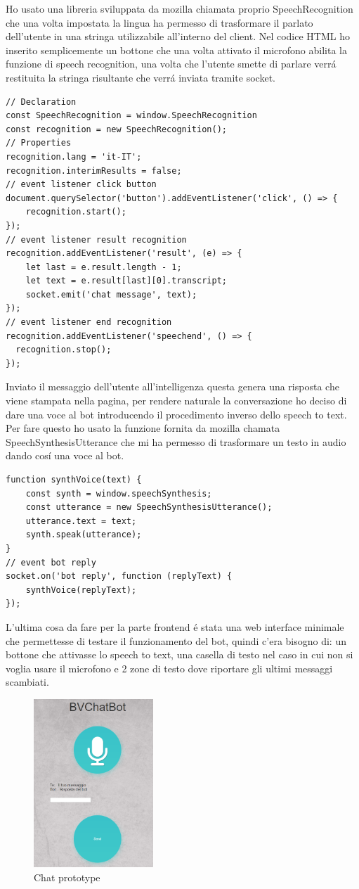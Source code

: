 Ho usato una libreria sviluppata da mozilla chiamata proprio SpeechRecognition che una volta impostata la lingua ha permesso di trasformare il parlato dell'utente in una stringa utilizzabile all'interno del client.
Nel codice HTML ho inserito semplicemente un bottone che una volta attivato il microfono abilita la funzione di speech recognition, una volta che l'utente smette di parlare verr\'a restituita la stringa risultante che verr\'a inviata tramite socket.
\begin{lstlisting}
// Declaration
const SpeechRecognition = window.SpeechRecognition
const recognition = new SpeechRecognition();
// Properties
recognition.lang = 'it-IT';
recognition.interimResults = false;
// event listener click button
document.querySelector('button').addEventListener('click', () => {
    recognition.start();
});
// event listener result recognition
recognition.addEventListener('result', (e) => {
    let last = e.result.length - 1; 
    let text = e.result[last][0].transcript;
    socket.emit('chat message', text);
});
// event listener end recognition
recognition.addEventListener('speechend', () => {
  recognition.stop();
});
\end{lstlisting}
Inviato il messaggio dell'utente all'intelligenza questa genera una risposta che viene stampata nella pagina, per rendere naturale la conversazione ho deciso di dare una voce al bot introducendo il procedimento inverso dello speech to text. Per fare questo ho usato la funzione fornita da mozilla chamata SpeechSynthesisUtterance che mi ha permesso di trasformare un testo in audio dando cos\'i una voce al bot.
\begin{lstlisting}
function synthVoice(text) {
    const synth = window.speechSynthesis;
    const utterance = new SpeechSynthesisUtterance();
    utterance.text = text;
    synth.speak(utterance);
}
// event bot reply
socket.on('bot reply', function (replyText) {
    synthVoice(replyText);
});
\end{lstlisting}
L'ultima cosa da fare per la parte frontend \'e stata una web interface minimale che permettesse di testare il funzionamento del bot, quindi c'era bisogno di: un bottone che attivasse lo speech to text, una casella di testo nel caso in cui non si voglia usare il microfono e 2 zone di testo dove riportare gli ultimi messaggi scambiati.
\begin{figure}[H]
 \centering
  \includegraphics[width=0.4\textwidth]{img/prototype.png}
 \caption{Chat prototype}
\end{figure}
